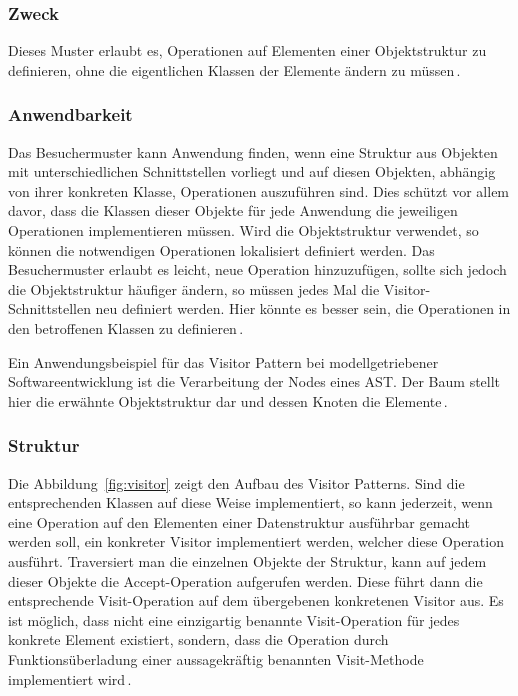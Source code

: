 \documentclass[12pt,oneside,a4paper,parskip]{scrbook}
\begin{document}
\subsubsection{Zweck}

Dieses Muster erlaubt es, Operationen auf Elementen einer Objektstruktur zu definieren, ohne die eigentlichen Klassen der Elemente ändern zu müssen\,\cite[S.\,480]{gamma2015}.

\subsubsection{Anwendbarkeit}

Das Besuchermuster kann Anwendung finden, wenn eine Struktur aus Objekten mit unterschiedlichen Schnittstellen vorliegt und auf diesen Objekten, abhängig von ihrer konkreten Klasse, Operationen auszuführen sind. Dies schützt vor allem davor, dass die Klassen dieser Objekte für jede Anwendung die jeweiligen Operationen implementieren müssen. Wird die Objektstruktur verwendet, so können die notwendigen Operationen lokalisiert definiert werden. Das Besuchermuster erlaubt es leicht, neue Operation hinzuzufügen, sollte sich jedoch die Objektstruktur häufiger ändern, so müssen jedes Mal die Visitor-Schnittstellen neu definiert werden. Hier könnte es besser sein, die Operationen in den betroffenen Klassen zu definieren\,\cite[S.\,484]{gamma2015}.

Ein Anwendungsbeispiel für das Visitor Pattern bei modellgetriebener Softwareentwicklung ist die Verarbeitung der Nodes eines AST. Der Baum stellt hier die erwähnte Objektstruktur dar und dessen Knoten die Elemente\,\cite[S.\,480]{gamma2015}.

\subsubsection{Struktur}

Die Abbildung~\ref{fig:visitor} zeigt den Aufbau des Visitor Patterns. Sind die entsprechenden Klassen auf diese Weise implementiert, so kann jederzeit, wenn eine Operation auf den Elementen einer Datenstruktur ausführbar gemacht werden soll, ein konkreter Visitor implementiert werden, welcher diese Operation ausführt. Traversiert man die einzelnen Objekte der Struktur, kann auf jedem dieser Objekte die Accept-Operation aufgerufen werden. Diese führt dann die entsprechende Visit-Operation auf dem übergebenen konkretenen Visitor aus. Es ist möglich, dass nicht eine einzigartig benannte Visit-Operation für jedes konkrete Element existiert, sondern, dass die Operation durch Funktionsüberladung einer aussagekräftig benannten Visit-Methode implementiert wird\,\cite[S.485 ff.]{gamma2015}.
\end{document}
